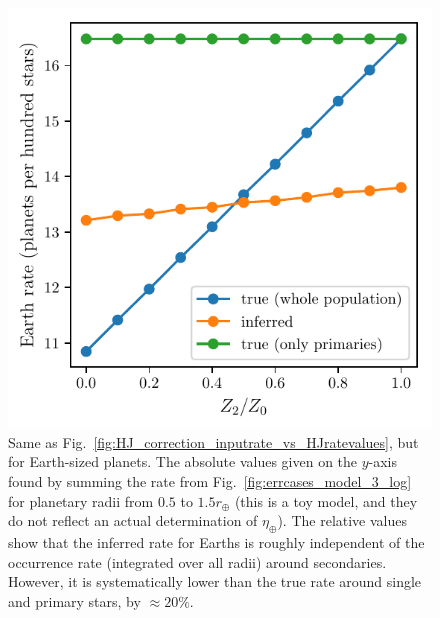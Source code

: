 \begin{figure}[!tb]
    \centering
    \includegraphics[width=.6\textwidth]{figures/earth_inputrate_vs_etaearthratevalues.pdf}
    \caption{
        Same as Fig.~\ref{fig:HJ_correction_inputrate_vs_HJratevalues}, but 
        for Earth-sized planets.
        The absolute values given on the $y$-axis found by summing the rate 
        from Fig.~\ref{fig:errcases_model_3_log} for planetary radii from 
        $0.5$ to $1.5r_\oplus$ (this is a toy model, and they do not reflect 
        an actual determination of $\eta_\oplus$).
        The relative values show that the inferred rate for Earths is roughly 
        independent of the occurrence rate (integrated over all radii) around 
        secondaries.
        However, it is systematically lower than the true rate around single 
        and primary stars, by $\approx 20\%$.
    }
    \label{fig:earth_inputrate_vs_etaearthratevalues}
\end{figure}